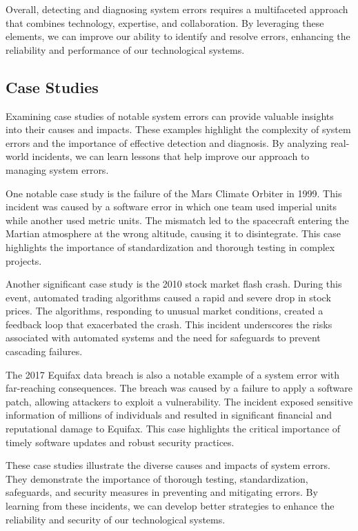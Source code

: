 \documentclass[10pt, conference, letterpaper]{IEEEtran}
\begin{document}
Overall, detecting and diagnosing system errors requires a multifaceted approach that combines technology, expertise, and collaboration. By leveraging these elements, we can improve our ability to identify and resolve errors, enhancing the reliability and performance of our technological systems.

\subsection{Case Studies}
Examining case studies of notable system errors can provide valuable insights into their causes and impacts. These examples highlight the complexity of system errors and the importance of effective detection and diagnosis. By analyzing real-world incidents, we can learn lessons that help improve our approach to managing system errors.

One notable case study is the failure of the Mars Climate Orbiter in 1999. This incident was caused by a software error in which one team used imperial units while another used metric units. The mismatch led to the spacecraft entering the Martian atmosphere at the wrong altitude, causing it to disintegrate. This case highlights the importance of standardization and thorough testing in complex projects.

Another significant case study is the 2010 stock market flash crash. During this event, automated trading algorithms caused a rapid and severe drop in stock prices. The algorithms, responding to unusual market conditions, created a feedback loop that exacerbated the crash. This incident underscores the risks associated with automated systems and the need for safeguards to prevent cascading failures.

The 2017 Equifax data breach is also a notable example of a system error with far-reaching consequences. The breach was caused by a failure to apply a software patch, allowing attackers to exploit a vulnerability. The incident exposed sensitive information of millions of individuals and resulted in significant financial and reputational damage to Equifax. This case highlights the critical importance of timely software updates and robust security practices.

These case studies illustrate the diverse causes and impacts of system errors. They demonstrate the importance of thorough testing, standardization, safeguards, and security measures in preventing and mitigating errors. By learning from these incidents, we can develop better strategies to enhance the reliability and security of our technological systems.
\end{document}
